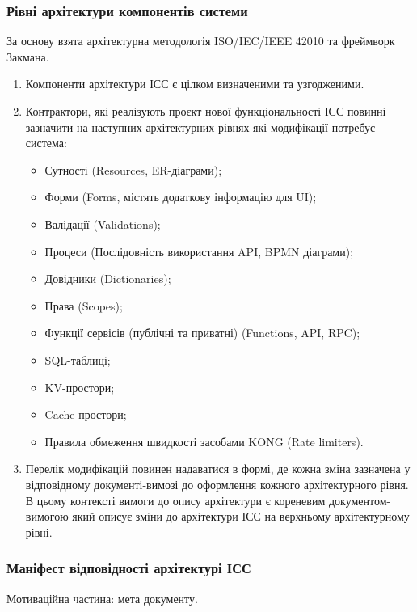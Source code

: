 \documentclass{article}
\begin{document}
\subsubsection{Рівні архітектури компонентів системи}

За основу взята архітектурна методологія ISO/IEC/IEEE 42010 та фреймворк Закмана.

\begin{enumerate}
  \item Компоненти архітектури ІСС є цілком визначеними та узгодженими.
  \item Контрактори, які реалізують проєкт нової функціональності ІСС повинні зазначити на
        наступних архітектурних рівнях які модифікації потребує система:
    \begin{itemize}
      \item Сутності (Resources, ER-діаграми);
      \item Форми (Forms, містять додаткову інформацію для UI);
      \item Валідації (Validations);
      \item Процеси (Послідовність використання API, BPMN діаграми);
      \item Довідники (Dictionaries);
      \item Права (Scopes);
      \item Функції сервісів (публічні та приватні) (Functions, API, RPC);
      \item SQL-таблиці;
      \item KV-простори;
      \item Cache-простори;
      \item Правила обмеження швидкості засобами KONG (Rate limiters).
    \end{itemize}
  \item Перелік модифікацій повинен надаватися в формі, де кожна зміна зазначена у відповідному
        документі-вимозі до оформлення кожного архітектурного рівня. В цьому контексті вимоги
        до опису архітектури є кореневим документом-вимогою який описує зміни до архітектури ІСС
        на верхньому архітектурному рівні.
\end{enumerate}

\newpage
\subsubsection{Маніфест відповідності архітектурі ІСС}

Мотиваційна частина: мета документу.
\end{document}
